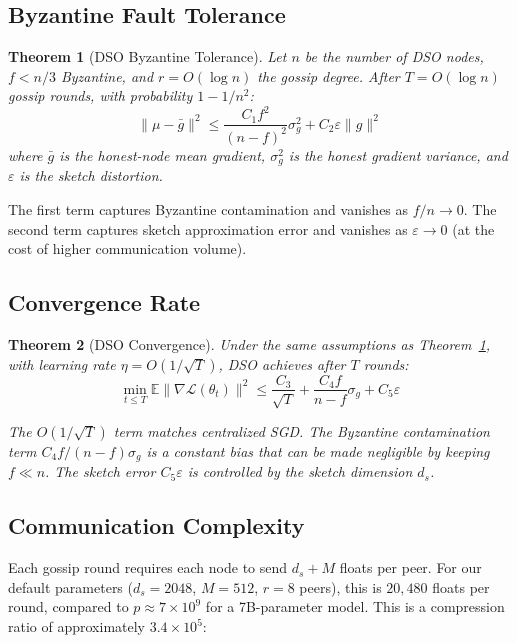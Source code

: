 \documentclass[11pt,a4paper]{article}
\newtheorem{theorem}{Theorem}
\begin{document}
\subsection{Byzantine Fault Tolerance}

\begin{theorem}[DSO Byzantine Tolerance]
\label{thm:byzantine}
Let $n$ be the number of DSO nodes, $f < n/3$ Byzantine, and $r = O(\log n)$ the
gossip degree. After $T = O(\log n)$ gossip rounds, with probability $1 - 1/n^2$:
\begin{equation}
    \|\mu - \bar{g}\|^2 \leq \frac{C_1 f^2}{(n-f)^2} \sigma_g^2 + C_2 \varepsilon \|g\|^2
    \label{eq:byz_thm}
\end{equation}
where $\bar{g}$ is the honest-node mean gradient, $\sigma_g^2$ is the honest gradient
variance, and $\varepsilon$ is the sketch distortion.
\end{theorem}

The first term captures Byzantine contamination and vanishes as $f/n \to 0$. The second
term captures sketch approximation error and vanishes as $\varepsilon \to 0$ (at the
cost of higher communication volume).

\subsection{Convergence Rate}

\begin{theorem}[DSO Convergence]
\label{thm:convergence}
Under the same assumptions as Theorem~\ref{thm:byzantine}, with learning rate
$\eta = O(1/\sqrt{T})$, DSO achieves after $T$ rounds:
\begin{equation}
    \min_{t \leq T} \mathbb{E}\|\nabla \mathcal{L}(\theta_t)\|^2
    \leq \frac{C_3}{\sqrt{T}} + \frac{C_4 f}{n-f} \sigma_g + C_5 \varepsilon
    \label{eq:dso_convergence}
\end{equation}

The $O(1/\sqrt{T})$ term matches centralized SGD. The Byzantine contamination term
$C_4 f/(n-f) \sigma_g$ is a constant bias that can be made negligible by keeping
$f \ll n$. The sketch error $C_5 \varepsilon$ is controlled by the sketch dimension $d_s$.
\end{theorem}

\subsection{Communication Complexity}

Each gossip round requires each node to send $d_s + M$ floats per peer. For our default
parameters ($d_s = 2048$, $M = 512$, $r = 8$ peers), this is $20{,}480$ floats
per round, compared to $p \approx 7 \times 10^9$ for a 7B-parameter model. This is a
compression ratio of approximately $3.4 \times 10^5$:
\end{document}
